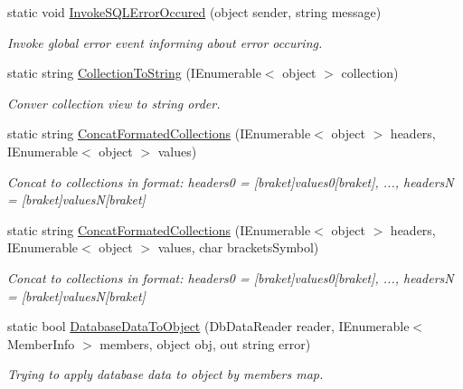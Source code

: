 \begin{DoxyCompactItemize}
\item 
static void \mbox{\hyperlink{class_uniform_data_operator_1_1_sql_1_1_sql_operator_handler_a898993886fbe98ece762f9f7f2af11fb}{Invoke\+S\+Q\+L\+Error\+Occured}} (object sender, string message)
\begin{DoxyCompactList}\small\item\em Invoke global error event informing about error occuring. \end{DoxyCompactList}\item 
static string \mbox{\hyperlink{class_uniform_data_operator_1_1_sql_1_1_sql_operator_handler_ab2de5b9d7f8e8e67b518cf39c7e6f7a5}{Collection\+To\+String}} (I\+Enumerable$<$ object $>$ collection)
\begin{DoxyCompactList}\small\item\em Conver collection view to string order. \end{DoxyCompactList}\item 
static string \mbox{\hyperlink{class_uniform_data_operator_1_1_sql_1_1_sql_operator_handler_a6973169901301adaecd52fab70df280e}{Concat\+Formated\+Collections}} (I\+Enumerable$<$ object $>$ headers, I\+Enumerable$<$ object $>$ values)
\begin{DoxyCompactList}\small\item\em Concat to collections in format\+: headers0 = \mbox{[}braket\mbox{]}values0\mbox{[}braket\mbox{]}, ..., headersN = \mbox{[}braket\mbox{]}valuesN\mbox{[}braket\mbox{]} \end{DoxyCompactList}\item 
static string \mbox{\hyperlink{class_uniform_data_operator_1_1_sql_1_1_sql_operator_handler_ac17e36b29fe5a17281927ab04dbeab26}{Concat\+Formated\+Collections}} (I\+Enumerable$<$ object $>$ headers, I\+Enumerable$<$ object $>$ values, char brackets\+Symbol)
\begin{DoxyCompactList}\small\item\em Concat to collections in format\+: headers0 = \mbox{[}braket\mbox{]}values0\mbox{[}braket\mbox{]}, ..., headersN = \mbox{[}braket\mbox{]}valuesN\mbox{[}braket\mbox{]} \end{DoxyCompactList}\item 
static bool \mbox{\hyperlink{class_uniform_data_operator_1_1_sql_1_1_sql_operator_handler_a97954b0bb1559fbe600c12aa5e2c53ef}{Database\+Data\+To\+Object}} (Db\+Data\+Reader reader, I\+Enumerable$<$ Member\+Info $>$ members, object obj, out string error)
\begin{DoxyCompactList}\small\item\em Trying to apply database data to object by members map. \end{DoxyCompactList}\item 

\end{DoxyCompactItemize}
